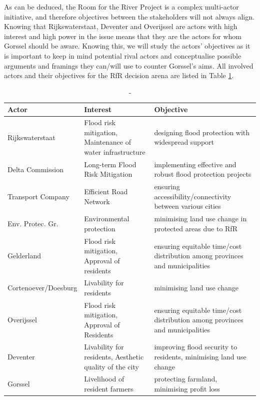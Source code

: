 As can be deduced, the Room for the River Project is a complex multi-actor initiative, and therefore objectives between the stakeholders will not always align. Knowing that Rijkswaterstaat, Deventer and Overijssel are actors with high interest and high power in the issue means that they are the actors for whom Gorssel should be aware. Knowing this, we will study the actors' objectives as it is important to keep in mind potential rival actors and conceptualise possible arguments and framings they can/will use to counter Gorssel's aims. All involved actors and their objectives for the RfR decision arena are listed in Table \ref{t:actortable}.

\begin{table}[h!]
\caption{-}
\begin{tabular}{p{}p{}p{}}
\hline 
Actor & Interest & Objective \\ \hline
Rijkswaterstaat         & Flood risk mitigation, Maintenance of water infrastructure & designing flood protection with widespread support \\ 
Delta Commission        & Long-term Flood Risk Mitigation & implementing effective and robust flood protection projects \\
Transport Company       & Efficient Road Network & ensuring accessibility/connectivity between various cities \\
Env. Protec. Gr.        & Environmental protection & minimising land use change in protected areas due to RfR \\
Gelderland              & Flood risk mitigation, Approval of residents & ensuring equitable time/cost distribution among provinces and municipalities \\
Cortenoever/Doesburg    & Livability for residents & minimising land use change \\
Overijssel              & Flood risk mitigation, Approval of Residents & ensuring equitable time/cost distribution among provinces and municipalities \\
Deventer                & Livability for residents, Aesthetic quality of the city & improving flood security to residents, minimising land use change \\
Gorssel                & Livelihood of resident farmers & protecting farmland, minimising profit loss \\
\end{tabular}
\label{t:actortable}
\end{table}

